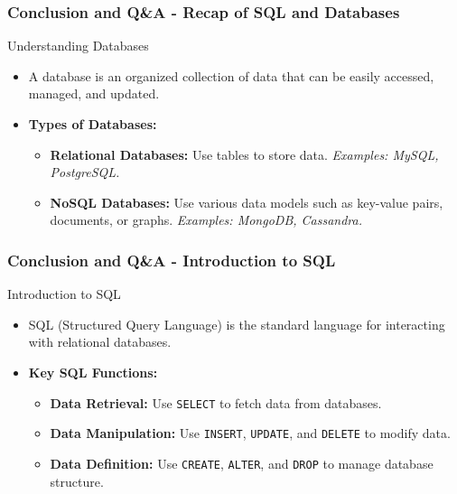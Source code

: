 \documentclass[aspectratio=169]{beamer}
\begin{document}
\begin{frame}[fragile]
    \frametitle{Conclusion and Q\&A - Recap of SQL and Databases}
    
    \begin{block}{Understanding Databases}
        \begin{itemize}
            \item A database is an organized collection of data that can be easily accessed, managed, and updated.
            \item \textbf{Types of Databases:}
            \begin{itemize}
                \item \textbf{Relational Databases:} Use tables to store data. \textit{Examples: MySQL, PostgreSQL.}
                \item \textbf{NoSQL Databases:} Use various data models such as key-value pairs, documents, or graphs. \textit{Examples: MongoDB, Cassandra.}
            \end{itemize}
        \end{itemize}
    \end{block}
\end{frame}

\begin{frame}[fragile]
    \frametitle{Conclusion and Q\&A - Introduction to SQL}
    
    \begin{block}{Introduction to SQL}
        \begin{itemize}
            \item SQL (Structured Query Language) is the standard language for interacting with relational databases.
            \item \textbf{Key SQL Functions:}
            \begin{itemize}
                \item \textbf{Data Retrieval:} Use \texttt{SELECT} to fetch data from databases.
                \item \textbf{Data Manipulation:} Use \texttt{INSERT}, \texttt{UPDATE}, and \texttt{DELETE} to modify data.
                \item \textbf{Data Definition:} Use \texttt{CREATE}, \texttt{ALTER}, and \texttt{DROP} to manage database structure.
            \end{itemize}
        \end{itemize}
    \end{block}
\end{frame}
\end{document}
